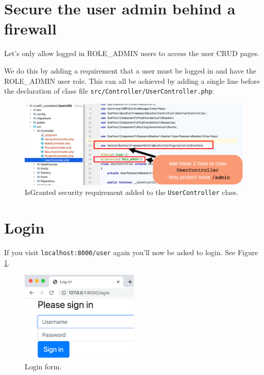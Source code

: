\documentclass[a4paperpaper,openright]{book}
\begin{document}
\hypertarget{secure-the-user-admin-behind-a-firewall}{%
\section{Secure the user admin behind a
firewall}\label{secure-the-user-admin-behind-a-firewall}}

Let's only allow logged in ROLE\_ADMIN users to access the user CRUD
pages.

We do this by adding a requirement that a user must be logged in and
have the ROLE\_ADMIN user role. This can all be achieved by adding a
single line before the declaration of class file
\texttt{src/Controller/UserController.php}:

\begin{figure}
\centering
\includegraphics[width=1\textwidth,height=\textheight]{./tex2pdf.-2b0e1314f8bbbae5/a63c83bb6c49061438fa7796f13ea49e4657cae5.png}
\caption{IsGranted security requirement added to the
\texttt{UserController} class.}
\end{figure}

\hypertarget{login}{%
\section{Login}\label{login}}

If you visit \texttt{localhost:8000/user} again you'll now be asked to
login. See Figure \ref{login}.

\begin{figure}
\centering
\includegraphics[width=0.5\textwidth,height=\textheight]{./tex2pdf.-2b0e1314f8bbbae5/dfbc39d266ca1d8b1fbd80ce0fe76702d4fb92f1.png}
\caption{Login form. \label{login}}
\end{figure}
\end{document}
